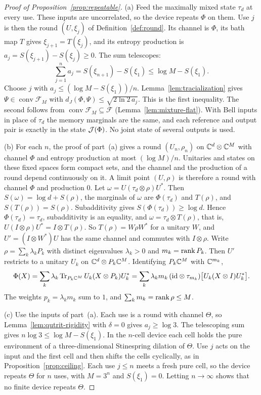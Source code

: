 \begin{proof}[Proof of Proposition~\ref{prop:repeatable}]
(a) Feed the maximally mixed state $\tau_d$ at every use. These inputs
are uncorrelated, so the device repeats $\Phi$ on them. Use $j$ is then
the round $(U,\xi_j)$ of Definition~\ref{def:round}. Its channel is
$\Phi$, its bath map $T$ gives $\xi_{j+1}=T(\xi_j)$, and its entropy
production is $a_j=S(\xi_{j+1})-S(\xi_j)\geq0$. The sum telescopes:
\[
 \sum_{j=1}^na_j=S(\xi_{n+1})-S(\xi_1)\leq\log M-S(\xi_1).
\]
Choose $j$ with $a_j\leq(\log M-S(\xi_1))/n$.
Lemma~\ref{lem:tracialization} gives $\Psi\in\operatorname{conv}\mathcal F_M$
with $d_J(\Phi,\Psi)\leq\sqrt{2\ln2\,a_j}$. This is the first
inequality. The second follows from
$\operatorname{conv}\mathcal F_M\subseteq\overline{\mathcal F}$
(Lemma~\ref{lem:mixture-flat}). With Bell inputs in place of $\tau_d$
the memory marginals are the same, and each reference and output pair
is exactly in the state $\mathcal J(\Phi)$. No joint state of several outputs
is used.

(b) For each $n$, the proof of part~(a) gives a round $(U_n,\rho_n)$ on
$\mathbb C^d\otimes\mathbb C^M$ with channel $\Phi$ and entropy production at most
$(\log M)/n$. Unitaries and states on these fixed spaces form compact
sets, and the channel and the production of a round depend continuously
on it. A limit point $(U,\rho)$ is therefore a round with channel $\Phi$
and production $0$. Let $\omega=U(\tau_d\otimes\rho)U^*$. Then
$S(\omega)=\log d+S(\rho)$, the marginals of $\omega$ are
$\Phi(\tau_d)$ and $T(\rho)$, and $S(T(\rho))=S(\rho)$. Subadditivity
gives $S(\Phi(\tau_d))\geq\log d$. Hence $\Phi(\tau_d)=\tau_d$,
subadditivity is an equality, and $\omega=\tau_d\otimes T(\rho)$, that
is, $U(I\otimes\rho)U^*=I\otimes T(\rho)$. So $T(\rho)=W\rho W^*$ for a
unitary $W$, and $U'=(I\otimes W^*)U$ has the same channel and commutes
with $I\otimes\rho$. Write $\rho=\sum_k\lambda_kP_k$ with distinct
eigenvalues $\lambda_k>0$ and $m_k=\operatorname{rank} P_k$. Then $U'$ restricts to a
unitary $U_k$ on $\mathbb C^d\otimes P_k\mathbb C^M$. Identifying $P_k\mathbb C^M$ with
$\mathbb C^{m_k}$,
\[
 \Phi(X)=\sum_k\lambda_k\operatorname{Tr}_{P_k\mathbb C^M}U_k(X\otimes P_k)U_k^*
 =\sum_k\lambda_km_k\,(\mathrm{id}\otimes\tau_{m_k})\bigl[U_k(X\otimes I)U_k^*\bigr].
\]
The weights $p_k=\lambda_km_k$ sum to $1$, and
$\sum_km_k=\operatorname{rank}\rho\leq M$.

(c) Use the inputs of part~(a). Each use is a round with channel
$\Theta$, so Lemma~\ref{lem:qutrit-rigidity} with $\delta=0$ gives
$a_j\geq\log3$. The telescoping sum gives $n\log3\leq\log M-S(\xi_1)$.
In the $n$-cell device each cell holds the pure environment of a
three-dimensional Stinespring dilation of $\Theta$. Use $j$ acts on the
input and the first cell and then shifts the cells cyclically, as in
Proposition~\ref{prop:ceiling}. Each use $j\leq n$ meets a fresh pure
cell, so the device repeats $\Theta$ for $n$ uses, with $M=3^n$ and
$S(\xi_1)=0$. Letting $n\to\infty$ shows that no finite device repeats
$\Theta$.


\end{proof}
